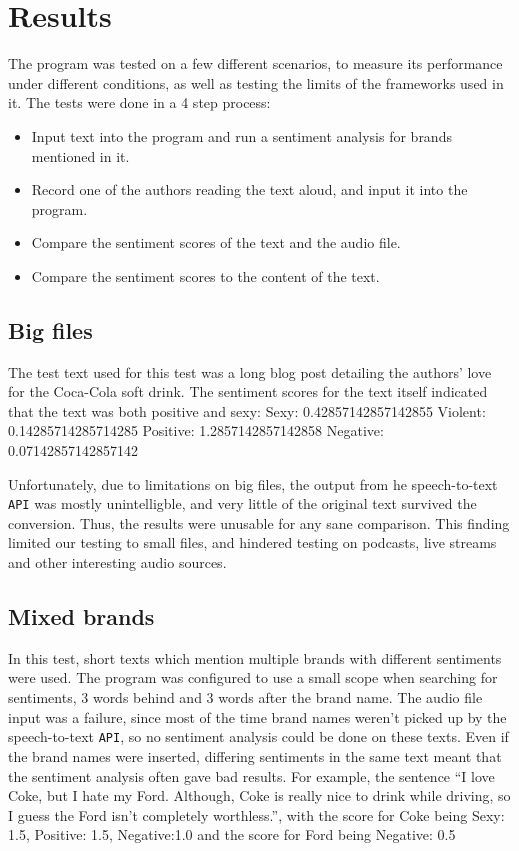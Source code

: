 \documentclass[a4paper,12pt,twoside]{ltxdoc}
\begin{document}
\section{Results}
The program was tested on a few different scenarios, to measure its performance under different conditions, as well as testing the limits of the frameworks used in it. The tests were done in a 4 step process:

\begin{itemize}
\item Input text into the program and run a sentiment analysis for brands mentioned in it.
\item Record one of the authors reading the text aloud, and input it into the program.
\item Compare the sentiment scores of the text and the audio file.
\item Compare the sentiment scores to the content of the text.
\end{itemize}

\subsection{Big files}
The test text used for this test was a long blog post detailing the authors' love for the Coca-Cola soft drink. The sentiment scores for the text itself indicated that the text was both positive and sexy:
Sexy: 0.42857142857142855 Violent: 0.14285714285714285 Positive: 1.2857142857142858 Negative: 0.07142857142857142


Unfortunately, due to limitations on big files, the output from he speech-to-text \verb#API# was mostly unintelligble, and very little of the original text survived the conversion. Thus, the results were unusable for any sane comparison. This finding limited our testing to small files, and hindered testing on podcasts, live streams and other interesting audio sources.

\subsection{Mixed brands}
In this test, short texts which mention multiple brands with different sentiments were used. The program was configured to use a small scope when searching for sentiments, 3 words behind and 3 words after the brand name. The audio file input was a failure, since most of the time brand names weren't picked up by the speech-to-text \verb#API#, so no sentiment analysis could be done on these texts. Even if the brand names were inserted, differing sentiments in the same text meant that the sentiment analysis often gave bad results. For example, the sentence ``I love Coke, but I hate my Ford. Although, Coke is really nice to drink while driving, so I guess the Ford isn't completely worthless.'', with the score for Coke being 
Sexy: 1.5, Positive: 1.5, Negative:1.0
and the score for Ford being
Negative: 0.5
\end{document}
